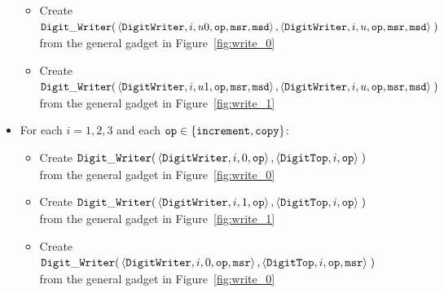 \begin{itemize}
\begin{itemize}
        \item Create
        $\begin{aligned}[t]
            {\tt Digit\_Writer}(& \left\langle {\tt DigitWriter}, i, u0, {\tt op}, {\tt msr}, {\tt msd} \right\rangle,
                       \left\langle {\tt DigitWriter},  i, u, {\tt op}, {\tt msr}, {\tt msd} \right\rangle \;)
        \end{aligned}$ \\ from the general gadget in Figure~\ref{fig:write_0}

        \item Create
        $\begin{aligned}[t]
            {\tt Digit\_Writer}(& \left\langle {\tt DigitWriter}, i,  u1, {\tt op}, {\tt msr}, {\tt msd} \right\rangle,
                       \left\langle {\tt DigitWriter}, i,  u,  {\tt op}, {\tt msr}, {\tt msd} \right\rangle \;)
        \end{aligned}$ \\ from the general gadget in Figure~\ref{fig:write_1}
        \end{itemize}

    \item For each $i = 1,2,3$ and each ${\tt op} \in \{{\tt increment}, {\tt copy} \}$:
    \begin{itemize}
        \item Create
        $\begin{aligned}[t]
            {\tt Digit\_Writer}(& \left\langle {\tt DigitWriter}, i, 0, {\tt op} \right\rangle,
                       \left\langle {\tt DigitTop},    i,    {\tt op} \right\rangle \;)
        \end{aligned}$ \\ from the general gadget in Figure~\ref{fig:write_0}

        \item Create
        $\begin{aligned}[t]
            {\tt Digit\_Writer}(& \left\langle {\tt DigitWriter}, i, 1, {\tt op}\right\rangle,
                       \left\langle {\tt DigitTop},    i,    {\tt op}\right\rangle \;)
        \end{aligned}$ \\ from the general gadget in Figure~\ref{fig:write_1}

        \item Create
        $\begin{aligned}[t]
            {\tt Digit\_Writer}(& \left\langle {\tt DigitWriter}, i, 0, {\tt op}, {\tt msr} \right\rangle,
                       \left\langle {\tt DigitTop},    i,    {\tt op}, {\tt msr} \right\rangle \;)
        \end{aligned}$ \\ from the general gadget in Figure~\ref{fig:write_0}


\end{itemize}
\end{itemize}
